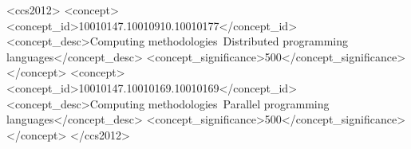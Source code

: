 
\begin{CCSXML}
<ccs2012>
    <concept>
        <concept_id>10010147.10010910.10010177</concept_id>
        <concept_desc>Computing methodologies~Distributed programming languages</concept_desc>
        <concept_significance>500</concept_significance>
    </concept>
    <concept>
        <concept_id>10010147.10010169.10010169</concept_id>
        <concept_desc>Computing methodologies~Parallel programming languages</concept_desc>
        <concept_significance>500</concept_significance>
    </concept>
</ccs2012>
\end{CCSXML}

